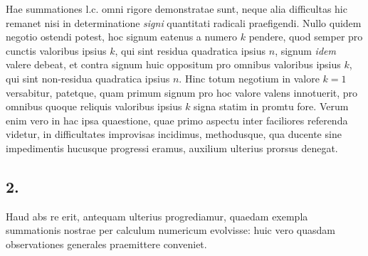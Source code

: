 \documentclass[twoside,12pt, showframe]{memoir}
\begin{document}
Hae summationes l.c. omni rigore demonstratae sunt, neque alia difficultas hic remanet nisi in determinatione \textit{signi} quantitati radicali praefigendi. Nullo quidem negotio ostendi potest, hoc signum eatenus a numero \(k\) pendere, quod semper pro cunctis valoribus ipsius \(k\), qui sint residua quadratica ipsius \(n\), signum \textit{idem} valere debeat, et contra signum huic oppositum pro omnibus valoribus ipsius \(k\), qui sint non-residua quadratica ipsius \(n\). Hinc totum negotium in valore \(k=1\) versabitur, patetque, quam primum signum pro hoc valore valens innotuerit, pro omnibus quoque reliquis valoribus ipsius \(k\) signa statim in promtu fore. Verum enim vero in hac ipsa quaestione, quae primo aspectu inter faciliores referenda videtur, in difficultates improvisas incidimus, methodusque, qua ducente sine impedimentis hucusque progressi eramus, auxilium ulterius prorsus denegat.

\subsection*{2.}
 
Haud abs re erit, antequam ulterius progrediamur, quaedam exempla summationis nostrae per calculum numericum evolvisse: huic vero quasdam observationes generales praemittere conveniet.\\
\end{document}
